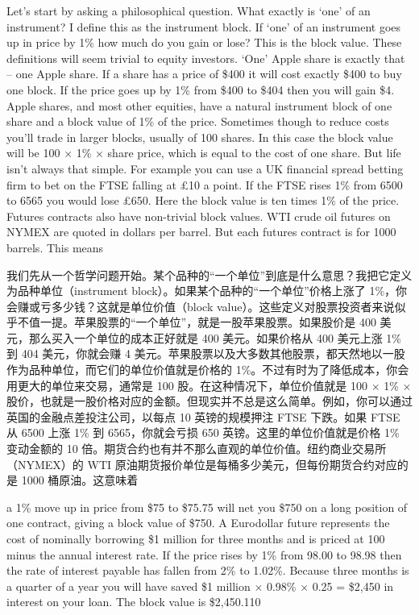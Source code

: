 \begin{englishblock} Let's start by asking a philosophical question. What exactly is ‘one' of an instrument? I define this as the instrument block. If ‘one' of an instrument goes up in price by 1\% how much do you gain or lose? This is the block value. These definitions will seem trivial to equity investors. ‘One' Apple share is exactly that -- one Apple share. If a share has a price of \$400 it will cost exactly \$400 to buy one block. If the price goes up by 1\% from \$400 to \$404 then you will gain \$4. Apple shares, and most other equities, have a natural instrument block of one share and a block value of 1\% of the price. Sometimes though to reduce costs you'll trade in larger blocks, usually of 100 shares. In this case the block value will be 100 × 1\% × share price, which is equal to the cost of one share. But life isn't always that simple. For example you can use a UK financial spread betting firm to bet on the FTSE falling at £10 a point. If the FTSE rises 1\% from 6500 to 6565 you would lose £650. Here the block value is ten times 1\% of the price. Futures contracts also have non-trivial block values. WTI crude oil futures on NYMEX are quoted in dollars per barrel. But each futures contract is for 1000 barrels. This means \end{englishblock}

\begin{chineseblock}我们先从一个哲学问题开始。某个品种的“一个单位”到底是什么意思？我把它定义为品种单位（instrument block）。如果某个品种的“一个单位”价格上涨了 1\%，你会赚或亏多少钱？这就是单位价值（block value）。这些定义对股票投资者来说似乎不值一提。苹果股票的“一个单位”，就是一股苹果股票。如果股价是 400 美元，那么买入一个单位的成本正好就是 400 美元。如果价格从 400 美元上涨 1\% 到 404 美元，你就会赚 4 美元。苹果股票以及大多数其他股票，都天然地以一股作为品种单位，而它们的单位价值就是价格的 1\%。不过有时为了降低成本，你会用更大的单位来交易，通常是 100 股。在这种情况下，单位价值就是 100 × 1\% × 股价，也就是一股价格对应的金额。但现实并不总是这么简单。例如，你可以通过英国的金融点差投注公司，以每点 10 英镑的规模押注 FTSE 下跌。如果 FTSE 从 6500 上涨 1\% 到 6565，你就会亏损 650 英镑。这里的单位价值就是价格 1\% 变动金额的 10 倍。期货合约也有并不那么直观的单位价值。纽约商业交易所（NYMEX）的 WTI 原油期货报价单位是每桶多少美元，但每份期货合约对应的是 1000 桶原油。这意味着\end{chineseblock}

\bipairgap

\begin{englishblock} a 1\% move up in price from \$75 to \$75.75 will net you \$750 on a long position of one contract, giving a block value of \$750. A Eurodollar future represents the cost of nominally borrowing \$1 million for three months and is priced at 100 minus the annual interest rate. If the price rises by 1\% from 98.00 to 98.98 then the rate of interest payable has fallen from 2\% to 1.02\%. Because three months is a quarter of a year you will have saved \$1 million × 0.98\% × 0.25 = \$2,450 in interest on your loan. The block value is \$2,450.110 \end{englishblock}

